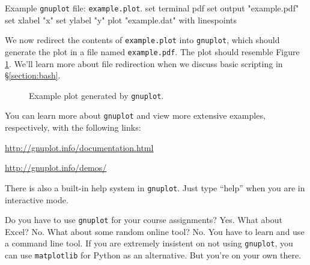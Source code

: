 \begin{pylisting}{Example \texttt{gnuplot} file: \texttt{example.plot}.}
set terminal pdf
set output "example.pdf"
set xlabel "x"
set ylabel "y"
plot "example.dat" with linespoints
\end{pylisting}

We now redirect the contents of \texttt{example.plot} into \texttt{gnuplot},
which should generate the plot in a file named \texttt{example.pdf}. The plot
should resemble Figure \ref{figure:example}. We'll learn more about file
redirection when we discuss basic \Bash{} scripting in \S\ref{section:bash}.


\begin{figure}[bth]
  \centering
  
  \caption{\label{figure:example}
    Example plot generated by \texttt{gnuplot}.
  }
\end{figure}

You can learn more about \texttt{gnuplot} and view more extensive examples,
respectively, with the following links:

\centerline{\url{http://gnuplot.info/documentation.html}}
\centerline{\url{http://gnuplot.info/demos/}}

There is also a built-in help system in \texttt{gnuplot}. Just type
``help'' when you are in interactive mode.

Do you have to use \texttt{gnuplot} for your course assignments? Yes. What about
Excel? No. What about some random online tool? No. You have to learn and use a
\Unix{} command line tool. If you are extremely insistent on not using
\texttt{gnuplot}, you can use \texttt{matplotlib} for Python as an alternative.
But you're on your own there.
